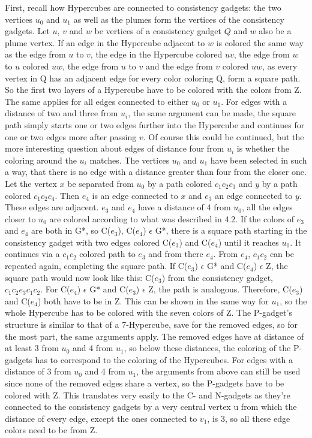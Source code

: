 \documentclass[12pt,a4paper]{article}
\begin{document}
First, recall how Hypercubes are connected to consistency gadgets: the two vertices $u_0$ and $u_1$ as well as the plumes form the vertices of the consistency gadgets. Let $u$, $v$ and $w$ be vertices of a consistency gadget $Q$ and $w$ also be a plume vertex. If an edge in the Hypercube adjacent to $w$ is colored the same way as the edge from $u$ to $v$, the edge in the Hypercube colored $uv$, the edge from $w$ to $u$ colored $uw$, the edge from $u$ to $v$ and the edge from $v$ colored $uw$, as every vertex in Q has an adjacent edge for every color coloring Q, form a square path. So the first two layers of a Hypercube have to be colored with the colors from Z. The same applies for all edges connected to either $u_0$ or $u_1$. For edges with a distance of two and three from $u_i$, the same argument can be made, the square path simply starts one or two edges further into the Hypercube and continues for one or two edges more after passing $v$. Of course this could be continued, but the more interesting question about edges of distance four from $u_i$ is whether the coloring around the $u_i$ matches. The vertices $u_0$ and $u_1$ have been selected in such a way, that there is no edge with a distance greater than four from the closer one. Let the vertex $x$ be separated from $u_0$ by a path colored $c_1c_2c_3$ and $y$ by a path colored $c_1c_2c_4$. Then $e_4$ is an edge connected to $x$ and $e_3$ an edge connected to $y$. These edges are adjacent. $e_3$ and $e_4$ have a distance of 4 from $u_0$, all the edges closer to $u_0$ are colored according to what was described in 4.2. If the colors of $e_3$ and $e_4$ are both in G*, so C($e_3$), C($e_4$) $\epsilon$ G*, there is a square path starting in the consistency gadget with two edges colored C($e_3$) and C($e_4$) until it reaches $u_0$. It continues via a $c_1c_2$ colored path to $e_3$ and from there $e_4$. From $e_4$, $c_1c_2$ can be repeated again, completing the square path. If C($e_3$) $\epsilon$ G* and C($e_4$) $\epsilon$ Z, the square path would now look like this: C($e_3$) from the consistency gadget, $c_1c_2e_3c_1c_2$. For C($e_4$) $\epsilon$ G* and C($e_3$) $\epsilon$ Z, the path is analogous. Therefore, C($e_3$) and C($e_4$) both have to be in Z. This can be shown in the same way for $u_1$, so the whole Hypercube has to be colored with the seven colors of Z. 
\newline
The P-gadget's structure is similar to that of a 7-Hypercube, save for the removed edges, so for the most part, the same arguments apply. The removed edges have at distance of at least 3 from $u_0$ and 4 from $u_1$, so below these distances, the coloring of the P-gadgets has to correspond to the coloring of the Hypercubes. For edges with a distance of 3 from $u_0$ and 4 from $u_1$, the arguments from above can still be used since none of the removed edges share a vertex, so the P-gadgets have to be colored with Z. This translates very easily to the C- and N-gadgets as they're connected to the consistency gadgets by a very central vertex u from which the distance of every edge, except the ones connected to $v_1$, is 3, so all these edge colors need to be from Z.
\end{document}
